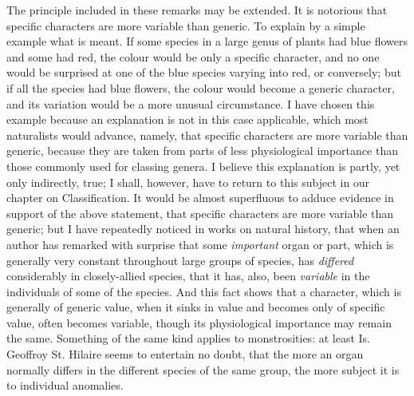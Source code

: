 \indent The principle included in these remarks may be extended. It is notorious that specific characters are more variable than generic. To explain by a simple example what is meant. If some species in a large genus of plants had blue flowers and some had red, the colour would be only a specific character, and no one would be surprised at one of the blue species varying into red, or conversely; but if all the species had blue flowers, the colour would become a generic character, and its variation would be a more unusual circumstance. I have chosen this example because an explanation is not in this case applicable, which most naturalists would advance, namely, that specific characters are more variable than generic, because they are taken from parts of less physiological importance than those commonly used for classing genera. I believe this explanation is partly, yet only indirectly, true; I shall, however, have to return to this subject in our chapter on Classification. It would be almost superfluous to adduce evidence in support of the above statement, that specific characters are more variable than generic; but I have repeatedly noticed in works on natural history, that when an author has remarked with surprise that some \emph{important} organ or part, which is generally very constant throughout large groups of species, has \emph{differed} considerably in closely-allied species, that it has, also, been \emph{variable} in the individuals of some of the species. And this fact shows that a character, which is generally of generic value, when it sinks in value and becomes only of specific value, often becomes variable, though its physiological importance may remain the same. Something of the same kind applies to monstrosities: at least Is. Geoffroy St. Hilaire seems to entertain no doubt, that the more an organ normally differs in the different species of the same group, the more subject it is to individual anomalies.\\
